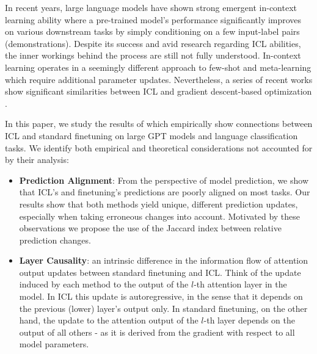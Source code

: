 In recent years, large language models \cite{brown20gpt3} have shown strong emergent in-context learning ability \cite{wei2022emergent} where a pre-trained model's performance significantly improves on various downstream tasks by simply conditioning on a few input-label pairs (demonstrations).
Despite its success and avid research regarding ICL abilities, the inner workings behind the process are still not fully understood.
In-context learning operates in a seemingly different approach to few-shot and meta-learning which require additional parameter updates.
Nevertheless, a series of recent works show significant similarities between ICL and gradient descent-based optimization \cite{irie22dual, pmlr-v202-von-oswald23a, akyürek2023learning}.  

In this paper, we study the results of \cite{dai2023gpt} which empirically show connections between ICL and standard finetuning on large GPT models and language classification tasks.
We identify both empirical and theoretical considerations not accounted for by their analysis:
\begin{itemize}
    \item \textbf{Prediction Alignment}: From the perspective of model prediction, we show that ICL's and finetuning's predictions are poorly aligned on most tasks. 
    Our results show that both methods yield unique, different prediction updates, especially when taking erroneous changes into account.
    Motivated by these observations we propose the use of the Jaccard index between relative prediction changes.    

    \item \textbf{Layer Causality}: an intrinsic difference in the information flow of attention output updates between standard finetuning and ICL.
    Think of the update induced by each method to the output of the $l$-th attention layer in the model.
    In ICL this update is autoregressive, in the sense that it depends on the previous (lower) layer's output only.
    In standard finetuning, on the other hand, the update to the attention output of the $l$-th layer depends on the output of all others - as it is derived from the gradient with respect to all model parameters.   
    
\end{itemize}
